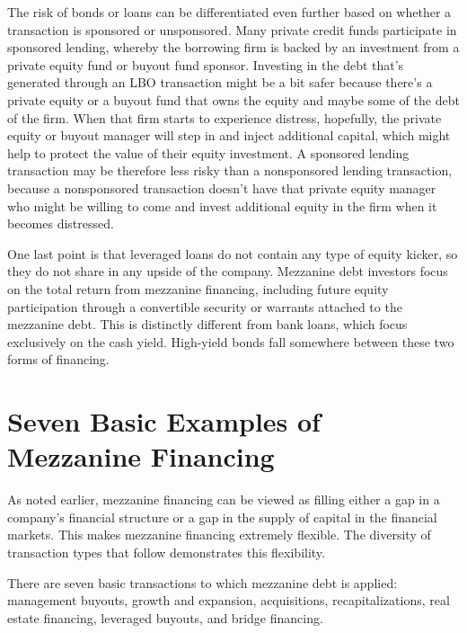 \documentclass[11pt]{article}
\begin{document}
The risk of bonds or loans can be differentiated even further based on whether a transaction is sponsored or unsponsored. Many private credit funds participate in sponsored lending, whereby the borrowing firm is backed by an investment from a private equity fund or buyout fund sponsor. Investing in the debt that's generated through an LBO transaction might be a bit safer because there's a private equity or a buyout fund that owns the equity and maybe some of the debt of the firm. When that firm starts to experience distress, hopefully, the private equity or buyout manager will step in and inject additional capital, which might help to protect the value of their equity investment. A sponsored lending transaction may be therefore less risky than a nonsponsored lending transaction, because a nonsponsored transaction doesn't have that private equity manager who might be willing to come and invest additional equity in the firm when it becomes distressed.

One last point is that leveraged loans do not contain any type of equity kicker, so they do not share in any upside of the company. Mezzanine debt investors focus on the total return from mezzanine financing, including future equity participation through a convertible security or warrants attached to the mezzanine debt. This is distinctly different from bank loans, which focus exclusively on the cash yield. High-yield bonds fall somewhere between these two forms of financing.

\section*{Seven Basic Examples of Mezzanine Financing}
As noted earlier, mezzanine financing can be viewed as filling either a gap in a company's financial structure or a gap in the supply of capital in the financial markets. This makes mezzanine financing extremely flexible. The diversity of transaction types that follow demonstrates this flexibility.

There are seven basic transactions to which mezzanine debt is applied: management buyouts, growth and expansion, acquisitions, recapitalizations, real estate financing, leveraged buyouts, and bridge financing.
\end{document}
